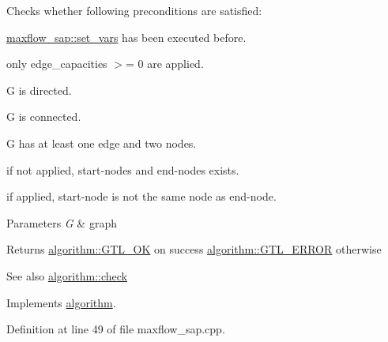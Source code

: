 Checks whether following preconditions are satisfied\+: 
\begin{DoxyItemize}
\item \mbox{\hyperlink{classmaxflow__sap_ac50ba0330c169c7ce697947a76702e13}{maxflow\+\_\+sap\+::set\+\_\+vars}} has been executed before. 
\item only edge\+\_\+capacities $>$= 0 are applied. 
\item {\ttfamily G} is directed. 
\item {\ttfamily G} is connected. 
\item {\ttfamily G} has at least one edge and two nodes. 
\item if not applied, start-\/nodes and end-\/nodes exists. 
\item if applied, start-\/node is not the same node as end-\/node. 
\end{DoxyItemize}


\begin{DoxyParams}{Parameters}
{\em G} & graph \\
\hline
\end{DoxyParams}
\begin{DoxyReturn}{Returns}
{\ttfamily \mbox{\hyperlink{classalgorithm_af1a0078e153aa99c24f9bdf0d97f6710a5114c20e4a96a76b5de9f28bf15e282b}{algorithm\+::\+G\+T\+L\+\_\+\+OK}}} on success {\ttfamily \mbox{\hyperlink{classalgorithm_af1a0078e153aa99c24f9bdf0d97f6710a6fcf574690bbd6cf710837a169510dd7}{algorithm\+::\+G\+T\+L\+\_\+\+E\+R\+R\+OR}}} otherwise 
\end{DoxyReturn}
\begin{DoxySeeAlso}{See also}
\mbox{\hyperlink{classalgorithm_a76361fb03ad1cf643affc51821e43bed}{algorithm\+::check}} 
\end{DoxySeeAlso}


Implements \mbox{\hyperlink{classalgorithm_a76361fb03ad1cf643affc51821e43bed}{algorithm}}.



Definition at line 49 of file maxflow\+\_\+sap.\+cpp.


